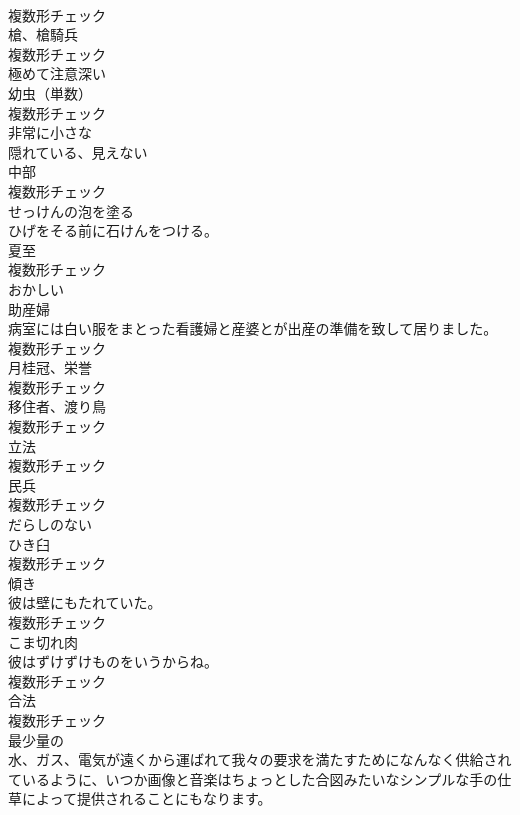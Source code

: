 \documentclass[8pt]{extreport}
\begin{document}
\begin{CJK}{UTF8}{min}
\\	複数形チェック
\\	[名詞]	槍、槍騎兵	
\\	複数形チェック
\\	[形容詞]	極めて注意深い	
\\	[名詞]	幼虫（単数）	
\\	複数形チェック
\\	[形容詞]	非常に小さな	
\\	[形容詞]	隠れている、見えない	
\\	[名詞]	中部	
\\	複数形チェック
\\	[動詞]	せっけんの泡を塗る	
\\	ひげをそる前に石けんをつける。	
\\	[名詞]	夏至	
\\	複数形チェック
\\	[形容詞]	おかしい	
\\	[名詞]	助産婦	
\\	病室には白い服をまとった看護婦と産婆とが出産の準備を致して居りました。	
\\	複数形チェック
\\	[名詞]	月桂冠、栄誉	
\\	複数形チェック
\\	[名詞]	移住者、渡り鳥	
\\	複数形チェック
\\	[名詞]	立法	
\\	複数形チェック
\\	[名詞]	⺠兵	
\\	複数形チェック
\\	[形容詞]	だらしのない	
\\	[名詞]	ひき臼	
\\	複数形チェック
\\	[名詞]	傾き	
\\	彼は壁にもたれていた。	
\\	複数形チェック
\\	[名詞]	こま切れ肉	
\\	彼はずけずけものをいうからね。	
\\	複数形チェック
\\	[名詞]	合法	
\\	複数形チェック
\\	[形容詞]	最少量の	
\\	水、ガス、電気が遠くから運ばれて我々の要求を満たすためになんなく供給されているように、いつか画像と音楽はちょっとした合図みたいなシンプルな手の仕草によって提供されることにもなります。	

\end{CJK}
\end{document}
